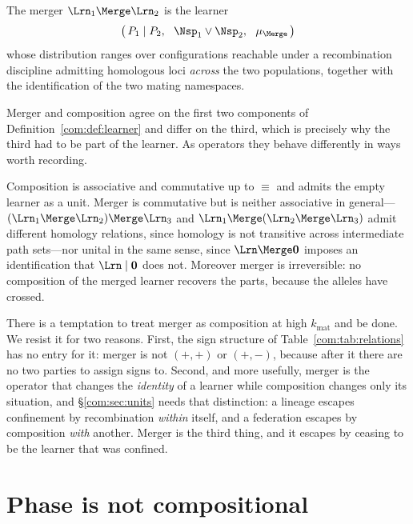 \begin{definition}[Merger]\label{com:def:merger}
The merger $\Lrn_1 \Merge \Lrn_2$ is the learner
\[
  \bigl(\,P_1 \mid P_2,\ \ \Nsp_1 \vee \Nsp_2,\ \ \mu_{\Merge}\,\bigr)
\]
whose distribution ranges over configurations reachable under a recombination discipline admitting
homologous loci \emph{across} the two populations, together with the identification of the two
mating namespaces.
\end{definition}

Merger and composition agree on the first two components of Definition~\ref{com:def:learner} and
differ on the third, which is precisely why the third had to be part of the learner. As operators
they behave differently in ways worth recording.

\begin{proposition}\label{com:merger-composition}
Composition is associative and commutative up to $\equiv$ and admits the empty learner as a unit.
Merger is commutative but is neither associative in general---$(\Lrn_1 \Merge \Lrn_2) \Merge
\Lrn_3$ and $\Lrn_1 \Merge (\Lrn_2 \Merge \Lrn_3)$ admit different homology relations, since
homology is not transitive across intermediate path sets---nor unital in the same sense, since
$\Lrn \Merge \mathbf{0}$ imposes an identification that $\Lrn \mid \mathbf{0}$ does not.
Moreover merger is irreversible: no composition of the merged learner recovers the parts, because
the alleles have crossed.
\end{proposition}

\begin{remark}\label{com:why-we-want-separate}
There is a temptation to treat merger as composition at high $k_{\mathrm{mat}}$ and be done. We
resist it for two reasons. First, the sign structure of Table~\ref{com:tab:relations} has no entry
for it: merger is not $(+,+)$ or $(+,-)$, because after it there are no two parties to assign
signs to. Second, and more usefully, merger is the operator that changes the \emph{identity} of a
learner while composition changes only its situation, and \S\ref{com:sec:units} needs that
distinction: a lineage escapes confinement by recombination \emph{within} itself, and a
federation escapes by composition \emph{with} another. Merger is the third thing, and it escapes
by ceasing to be the learner that was confined.
\end{remark}

\section{Phase is not compositional}\label{com:sec:phase}\label{com:S9}

